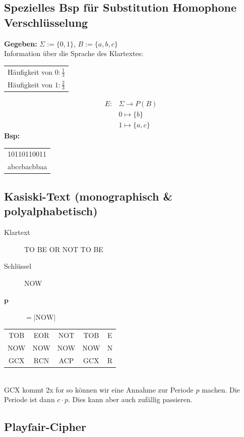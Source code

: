 \documentclass[landscape,twocolumn,a4paper]{article}
\newcommand{\Bold}[1]{\textbf{#1}} %
\newcommand{\T}[1]{\text{#1}} %
\newcommand{\Abs}[1]{\left| #1 \right|} %
\newcommand{\Oneover}[1]{\frac{1}{#1}} %
\begin{document}
\subsection{Spezielles Bsp für Substitution Homophone Verschlüsselung}
\Bold{Gegeben:} $\Sigma:=\{0,1\}$, $B:=\{a,b,c\}$\\
Information über die Sprache des Klartextes:
\begin{tabular}{l}
 Häufigkeit von $0:\Oneover{3}$\\
 Häufigkeit von $1:\frac{2}{3}$
\end{tabular}
\begin{align*}
	E: & \Sigma \to P(B) \\
	& 0 \mapsto \{b\} \\
	& 1 \mapsto \{a,c\}
\end{align*}
\Bold{Bsp:}
\begin{tabular}{l}
 10110110011\\
 abccbacbbaa
\end{tabular}
\subsection{Kasiski-Text (monographisch \& polyalphabetisch)}
\begin{description}
	\item[Klartext] TO BE OR NOT TO BE
	\item[Schlüssel] NOW
	\item[$\mathbf{p}$] $=\Abs{\T{NOW}}$
\end{description}
\begin{tabular}{c|c|c|c|c}
 TOB&EOR&NOT&TOB&E\\
 NOW&NOW&NOW&NOW&N\\
 GCX&RCN&ACP&GCX&R
\end{tabular}\\
GCX kommt 2x for so können wir eine Annahme zur Periode $p$ machen. Die Periode ist dann $c\cdot p$. Dies kann aber auch zufällig passieren.
\subsection{Playfair-Cipher}
\end{document}
